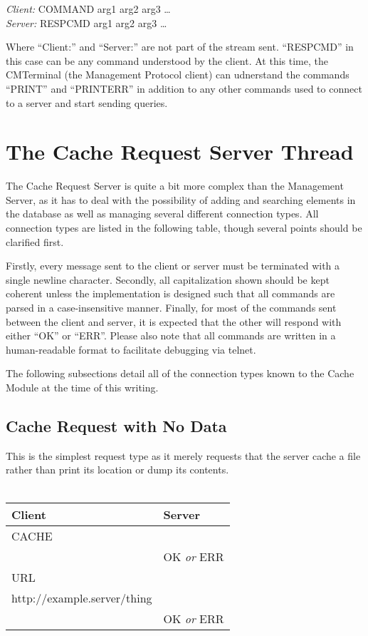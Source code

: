 \documentclass[letterpaper]{article}
\begin{document}
\begin{addmargin}[1em]{2em}
\textit{Client:} COMMAND arg1 arg2 arg3 \ldots\\
\textit{Server:} RESPCMD arg1 arg2 arg3 \ldots\\
\end{addmargin}

Where ``Client:'' and ``Server:'' are not part of the stream sent. ``RESPCMD'' in this case can be any command understood by the client. At this time, the CMTerminal (the Management Protocol client) can udnerstand the commands ``PRINT'' and ``PRINTERR'' in addition to any other commands used to connect to a server and start sending queries. 

\section{The Cache Request Server Thread}
The Cache Request Server is quite a bit more complex than the Management Server, as it has to deal with the possibility of adding and searching elements in the database as well as managing several different connection types. All connection types are listed in the following table, though several points should be clarified first.

Firstly, every message sent to the client or server must be terminated with a single newline character. Secondly, all capitalization shown should be kept coherent unless the implementation is designed such that all commands are parsed in a case-insensitive manner. Finally, for most of the commands sent between the client and server, it is expected that the other will respond with either ``OK'' or ``ERR''. Please also note that all commands are written in a human-readable format to facilitate debugging via telnet.

The following subsections detail all of the connection types known to the Cache Module at the time of this writing.\\

\subsection{Cache Request with No Data}
This is the simplest request type as it merely requests that the server cache a file rather than print its location or dump its contents.
\\ %
\\
\begin{tabular}{|l|l|}
\hline
\textbf{Client} & \textbf{Server}\\
\hline
\hline
CACHE &\\
\hline
& OK \textit{or} ERR\\
\hline
URL & \\
http://example.server/thing & \\
\hline
& OK \textit{or} ERR\\
\hline
\end{tabular}
\end{document}
